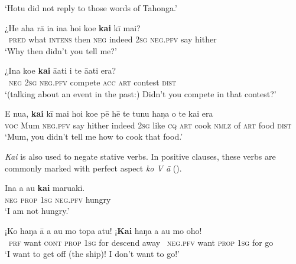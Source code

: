 \glt 
‘Hotu did not reply to those words of Tahonga.’ \textstyleExampleref{[R301.273]} 
\z

\ea\label{ex:10.117}
\gll ¿He aha rā ia {\ꞌ}ina ho{\ꞌ}i koe \textbf{kai} kī mai? \\
~\textsc{pred} what \textsc{intens} then \textsc{neg} indeed \textsc{2sg} \textsc{neg.pfv} say hither \\

\glt 
‘Why then didn’t you tell me?’ \textstyleExampleref{[R372.050]} 
\z

\ea\label{ex:10.118}
\gll ¿{\ꞌ}Ina koe \textbf{kai} {\ꞌ}ā{\ꞌ}ati i te {\ꞌ}ā{\ꞌ}ati era? \\
~\textsc{neg} \textsc{2sg} \textsc{neg.pfv} compete \textsc{acc} \textsc{art} contest \textsc{dist} \\

\glt 
‘(talking about an event in the past:) Didn’t you compete in that contest?’ \textstyleExampleref{[R415.738]} 
\z

\ea\label{ex:10.119}
\gll E nua, \textbf{kai} kī mai ho{\ꞌ}i koe pē hē te tunu haŋa o te kai era \\
\textsc{voc} Mum \textsc{neg.pfv} say hither indeed \textsc{2sg} like \textsc{cq} \textsc{art} cook \textsc{nmlz} of \textsc{art} food \textsc{dist} \\

\glt 
‘Mum, you didn’t tell me how to cook that food.’ \textstyleExampleref{[R236.091]} 
\z

\textit{Kai} is also used to negate stative verbs. In positive clauses, these verbs are commonly marked with perfect aspect \textit{ko V {\ꞌ}ā} ().

\ea\label{ex:10.120}
\gll {\ꞌ}Ina a au \textbf{kai} maruaki. \\
\textsc{neg} \textsc{prop} \textsc{1sg} \textsc{neg.pfv} hungry \\

\glt 
‘I am not hungry.’ \textstyleExampleref{[R208.250]} 
\z

\ea\label{ex:10.121}
\gll ¡Ko haŋa {\ꞌ}ā a au mo topa atu! ¡\textbf{Kai} haŋa a au mo oho!  \\
~\textsc{prf} want \textsc{cont} \textsc{prop} \textsc{1sg} for descend away ~\textsc{neg.pfv} want \textsc{prop} \textsc{1sg} for go  \\

\glt 
‘I want to get off (the ship)! I don’t want to go!’ \textstyleExampleref{[R210.106–107]}
\z

